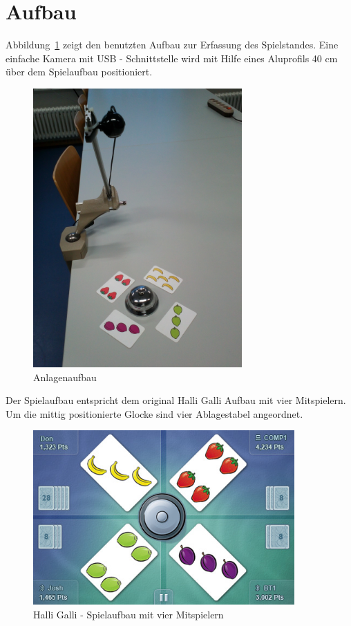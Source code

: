 
\section{Aufbau}
\label{sec:Kapitel}

Abbildung~\ref{fig:Anlage} zeigt den benutzten Aufbau zur Erfassung des Spielstandes. Eine einfache Kamera mit USB - Schnittstelle wird mit Hilfe eines Aluprofils 40 cm über dem Spielaufbau positioniert.

\begin{figure}[]
    \centering
    \includegraphics[width=8cm]{Abbildungen/KameraAufbau}
    \caption[Anlage]{Anlagenaufbau}
    \label{fig:Anlage}
\end{figure}

Der Spielaufbau entspricht dem original Halli Galli Aufbau mit vier Mitspielern. Um die mittig positionierte Glocke sind vier Ablagestabel angeordnet. 

\begin{figure}[h]
    \centering
    \includegraphics[width=10cm]{Abbildungen/Aufbau}
    \caption[Spielaufbau]{Halli Galli - Spielaufbau mit vier Mitspielern}
    \label{fig:Spielaufbau}
\end{figure}

